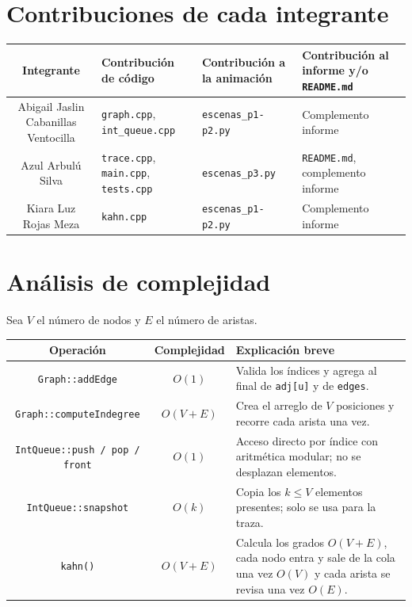 \documentclass[a4paper, table]{article}
\begin{document}
\section{Contribuciones de cada integrante}

    \begin{table}[H]
        \centering        
        \begin{tabular}{|c|p{3.5cm}|p{3.5cm}|p{3.5cm}|}
            \hline \textbf{Integrante} & \textbf{Contribución de código} & \textbf{Contribución a la animación} & \textbf{Contribución al informe y/o \texttt{README.md}} \\
            \hline Abigail Jaslin Cabanillas Ventocilla & 
            \texttt{graph.cpp}, \texttt{int\_queue.cpp} & 
            \texttt{escenas\_p1-p2.py} & 
            Complemento informe \\
            \hline Azul Arbulú Silva &
            \texttt{trace.cpp}, \texttt{main.cpp}, \texttt{tests.cpp} & 
            \texttt{escenas\_p3.py} & 
            \texttt{README.md}, complemento informe \\ 
            \hline Kiara Luz Rojas Meza & 
            \texttt{kahn.cpp} &
            \texttt{escenas\_p1-p2.py} & 
            Complemento informe \\ \hline
        \end{tabular}    
    \end{table}

\section{Análisis de complejidad}

    Sea $V$ el número de nodos y $E$ el número de aristas.

    \begin{table}[H]  
        \centering
        \begin{tabular}{|c|c|p{7cm}|} 
            \hline \textbf{Operación} & \textbf{Complejidad} & \textbf{Explicación breve}\\
            \hline \texttt{Graph::addEdge} & $O(1)$ & Valida los índices y agrega al final de \texttt{adj[u]} y de \texttt{edges}. \\
            \hline \texttt{Graph::computeIndegree} & $O(V+E)$ & Crea el arreglo de $V$ posiciones y recorre cada arista una vez. \\
            \hline \texttt{IntQueue::push / pop / front} & $O(1)$ & Acceso directo por índice con aritmética modular; no se desplazan elementos. \\
            \hline \texttt{IntQueue::snapshot} & $O(k)$ & Copia los $k \leq V$ elementos presentes; solo se usa para la traza. \\
            \hline \texttt{kahn()} & $O(V+E)$ & Calcula los grados $O(V+E)$, cada nodo entra y sale de la cola una vez $O(V)$ y cada arista se revisa una vez $O(E)$. \\\hline
        \end{tabular}    
    \end{table}
\end{document}
